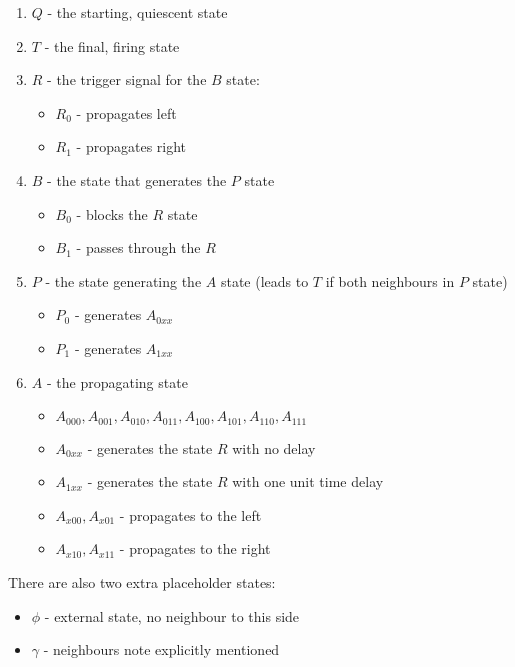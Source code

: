 \documentclass[11pt,a4paper]{article}
\begin{document}
    \begin{enumerate}
        \item $Q$ - the starting, quiescent state
        \item $T$ - the final, firing state
        \item $R$ - the trigger signal for the $B$ state:
            \begin{itemize}
                \item $R_0$ - propagates left
                \item $R_1$ - propagates right
            \end{itemize}
        \item $B$ - the state that generates the $P$ state
            \begin{itemize}
                \item $B_0$ - blocks the $R$ state
                \item $B_1$ - passes through the $R$
            \end{itemize}
        \item $P$ - the state generating the $A$ state (leads to $T$ if both
            neighbours in $P$ state)
            \begin{itemize}
                \item $P_0$ - generates $A_{0xx}$
                \item $P_1$ - generates $A_{1xx}$
            \end{itemize}
        \item $A$ - the propagating state
            \begin{itemize}
                \item $A_{000}, A_{001}, A_{010}, A_{011}, A_{100}, A_{101},
                    A_{110}, A_{111}$
                \item $A_{0xx}$ - generates the state $R$ with no delay
                \item $A_{1xx}$ - generates the state $R$ with one unit time
                    delay
                \item $A_{x00}, A_{x01}$ - propagates to the left
                \item $A_{x10}, A_{x11}$ - propagates to the right
            \end{itemize}
    \end{enumerate}

    There are also two extra placeholder states:
    \begin{itemize}
        \item $\phi$ - external state, no neighbour to this side
        \item $\gamma$ - neighbours note explicitly mentioned
    \end{itemize}
\end{document}
